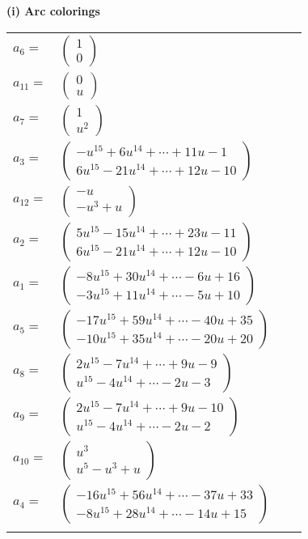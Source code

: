 \documentclass[1p]{elsarticle_modified}
\theoremstyle{definition}
\begin{document}
\flushleft \textbf{(i) Arc colorings}\\
\begin{tabular}{m{7pt} m{180pt} m{7pt} m{180pt} }
\flushright $a_{6}=$&$\begin{pmatrix}1\\0\end{pmatrix}$ \\
\flushright $a_{11}=$&$\begin{pmatrix}0\\u\end{pmatrix}$ \\
\flushright $a_{7}=$&$\begin{pmatrix}1\\u^2\end{pmatrix}$ \\
\flushright $a_{3}=$&$\begin{pmatrix}- u^{15}+6 u^{14}+\cdots+11 u-1\\6 u^{15}-21 u^{14}+\cdots+12 u-10\end{pmatrix}$ \\
\flushright $a_{12}=$&$\begin{pmatrix}- u\\- u^3+u\end{pmatrix}$ \\
\flushright $a_{2}=$&$\begin{pmatrix}5 u^{15}-15 u^{14}+\cdots+23 u-11\\6 u^{15}-21 u^{14}+\cdots+12 u-10\end{pmatrix}$ \\
\flushright $a_{1}=$&$\begin{pmatrix}-8 u^{15}+30 u^{14}+\cdots-6 u+16\\-3 u^{15}+11 u^{14}+\cdots-5 u+10\end{pmatrix}$ \\
\flushright $a_{5}=$&$\begin{pmatrix}-17 u^{15}+59 u^{14}+\cdots-40 u+35\\-10 u^{15}+35 u^{14}+\cdots-20 u+20\end{pmatrix}$ \\
\flushright $a_{8}=$&$\begin{pmatrix}2 u^{15}-7 u^{14}+\cdots+9 u-9\\u^{15}-4 u^{14}+\cdots-2 u-3\end{pmatrix}$ \\
\flushright $a_{9}=$&$\begin{pmatrix}2 u^{15}-7 u^{14}+\cdots+9 u-10\\u^{15}-4 u^{14}+\cdots-2 u-2\end{pmatrix}$ \\
\flushright $a_{10}=$&$\begin{pmatrix}u^3\\u^5- u^3+u\end{pmatrix}$ \\
\flushright $a_{4}=$&$\begin{pmatrix}-16 u^{15}+56 u^{14}+\cdots-37 u+33\\-8 u^{15}+28 u^{14}+\cdots-14 u+15\end{pmatrix}$\\&\end{tabular}
\end{document}
